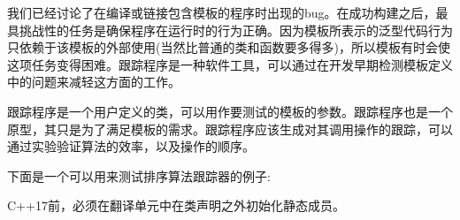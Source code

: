 我们已经讨论了在编译或链接包含模板的程序时出现的bug。在成功构建之后，最具挑战性的任务是确保程序在运行时的行为正确。因为模板所表示的泛型代码行为只依赖于该模板的外部使用(当然比普通的类和函数要多得多)，所以模板有时会使这项任务变得困难。跟踪程序是一种软件工具，可以通过在开发早期检测模板定义中的问题来减轻这方面的工作。

跟踪程序是一个用户定义的类，可以用作要测试的模板的参数。跟踪程序也是一个原型，其只是为了满足模板的需求。跟踪程序应该生成对其调用操作的跟踪，可以通过实验验证算法的效率，以及操作的顺序。

下面是一个可以用来测试排序算法跟踪器的例子:

\begin{tcolorbox}[colback=webgreen!5!white,colframe=webgreen!75!black]
\hspace*{0.75cm}C++17前，必须在翻译单元中在类声明之外初始化静态成员。
\end{tcolorbox}

